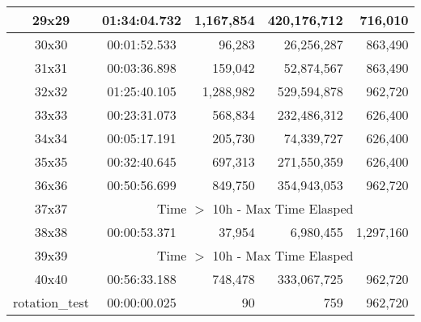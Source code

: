 \begin{center}
\begin{tabular}{|c|c|r|r|r|}
		29x29 & 01:34:04.732 & 1,167,854 & 420,176,712 & 716,010 \\ \hline
		30x30 & 00:01:52.533 & 96,283 & 26,256,287 & 863,490 \\ \hline
		31x31 & 00:03:36.898 & 159,042 & 52,874,567 & 863,490 \\ \hline
		32x32 & 01:25:40.105 & 1,288,982 & 529,594,878 & 962,720 \\ \hline
		33x33 & 00:23:31.073 & 568,834 & 232,486,312 & 626,400 \\ \hline
		34x34 & 00:05:17.191 & 205,730 & 74,339,727 & 626,400 \\ \hline
		35x35 & 00:32:40.645 & 697,313 & 271,550,359 & 626,400 \\ \hline
		36x36 & 00:50:56.699 & 849,750 & 354,943,053 & 962,720 \\ \hline
		37x37 & \multicolumn{4}{|c|}{Time $>$ 10h - Max Time Elasped} \\ \hline
		38x38 & 00:00:53.371 & 37,954 & 6,980,455 & 1,297,160 \\ \hline
		39x39 & \multicolumn{4}{|c|}{Time $>$ 10h - Max Time Elasped} \\ \hline
		40x40 & 00:56:33.188 & 748,478 & 333,067,725 & 962,720 \\ \hline
		rotation\_test & 00:00:00.025 & 90 & 759 & 962,720 \\ \hline

    \end{tabular}
\end{center}
